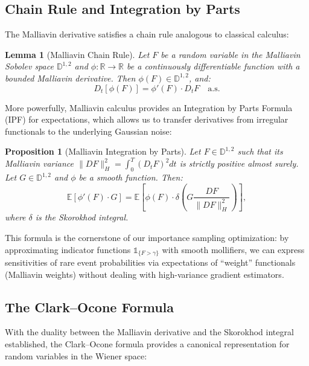 \documentclass[11pt]{article}
\newtheorem{lemma}{Lemma}
\newtheorem{proposition}{Proposition}
\begin{document}
\subsection{Chain Rule and Integration by Parts}

The Malliavin derivative satisfies a chain rule analogous to classical calculus:

\begin{lemma}[Malliavin Chain Rule]
Let $F$ be a random variable in the Malliavin Sobolev space $\mathbb{D}^{1,2}$ and $\phi : \mathbb{R} \to \mathbb{R}$ be a continuously differentiable function with a bounded Malliavin derivative. Then $\phi(F) \in \mathbb{D}^{1,2}$, and:
\begin{equation}
D_t[\phi(F)] = \phi'(F) \cdot D_t F \quad \text{a.s.}
\label{eq:chain_rule}
\end{equation}
\end{lemma}

\noindent
More powerfully, Malliavin calculus provides an Integration by Parts Formula (IPF) for expectations, which allows us to transfer derivatives from irregular functionals to the underlying Gaussian noise:

\begin{proposition}[Malliavin Integration by Parts]
\label{prop:malliavin_ibp}
Let $F \in \mathbb{D}^{1,2}$ such that its Malliavin variance $\|DF\|_H^2 = \int_0^T (D_t F)^2 dt$ is strictly positive almost surely. Let $G \in \mathbb{D}^{1,2}$ and $\phi$ be a smooth function. Then:
\begin{equation}
\mathbb{E}[\phi'(F) \cdot G] = \mathbb{E}\left[\phi(F) \cdot \delta\left( G \frac{DF}{\|DF\|_H^2} \right)\right],
\label{eq:malliavin_ibp}
\end{equation}
where $\delta$ is the Skorokhod integral.
\end{proposition}

\noindent
This formula is the cornerstone of our importance sampling optimization: by approximating indicator functions $\mathds{1}_{\{F > \gamma\}}$ with smooth mollifiers, we can express sensitivities of rare event probabilities via expectations of ``weight'' functionals (Malliavin weights) without dealing with high-variance gradient estimators.

\subsection{The Clark--Ocone Formula}

With the duality between the Malliavin derivative and the Skorokhod integral established, the Clark--Ocone formula provides a canonical representation for random variables in the Wiener space:
\end{document}
